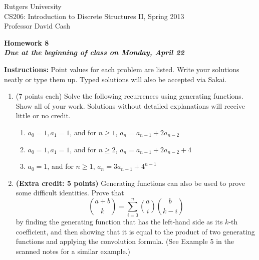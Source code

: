 \documentclass[11pt]{article}
\begin{document}
\sloppy

\noindent Rutgers University\\
CS206: Introduction to Discrete Structures II, Spring 2013\\
Professor David Cash\\

\begin{center}
\LARGE{\textbf{Homework 8}}\\
\large{\textbf{\emph{Due at the beginning of class on Monday, April 22}}}
\end{center}

\vspace{.1in}

\noindent\textbf{Instructions:} Point values for each problem are listed.
Write your solutions neatly or type them up.  Typed solutions will also be
accepted via Sakai.

\begin{enumerate}

\item (7 points each) Solve the following recurrences using generating
functions.  Show all of your work.  Solutions without detailed
explanations will receive little or no credit.
\begin{enumerate}
\item $a_0 = 1, a_1=1$, and for $n\geq 1$, $a_n = a_{n-1} + 2a_{n-2}$
\item $a_0 = 1, a_1=1$, and for $n\geq 2$, $a_n = a_{n-1} + 2 a_{n-2} + 4$
\item $a_0 = 1$, and for $n\geq 1$, $a_n = 3a_{n-1} + 4^{n-1}$
\end{enumerate}

\item \textbf{(Extra credit: 5 points)} Generating functions can also
be used to prove some difficult identities.  Prove that
\[
\binom{a+b}{k} = 
\sum_{i=0}^n \binom{a}{i}\binom{b}{k-i} 
\]
by finding the generating function that has the left-hand side as its
$k$-th coefficient, and then showing 
that it is equal to the product of two generating
functions and applying the convolution formula.  (See Example 5 in
the scanned notes for a similar example.)
\end{enumerate}
\end{document}
